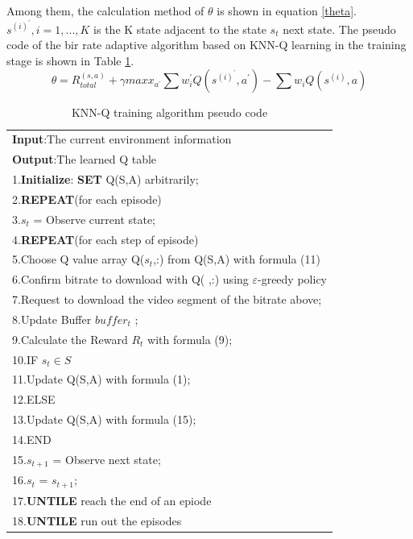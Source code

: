 \documentclass[twocolumn]{article}
\renewcommand\arraystretch{1.2}
\begin{document}
Among them, the calculation method of $\theta$ is shown in equation \ref{theta}. 
$s^{(i)^{\prime}}, i=1, ..., K$ is the K state adjacent to the state $s_{t}$ next state. 
The pseudo code of the bir rate adaptive algorithm based on KNN-Q learning in the training stage is shown in Table \ref{KNN-Q training}.
\begin{equation}
\label{theta}
\theta=R_{total}^{(s,a)}+\gamma max x_{a^\prime}\sum w_{i}^{\prime}Q(s^{(i)^{\prime}},a^{\prime})-\sum w_{i}Q(s^{(i)},a)
\end{equation}
\begin{table}[htbp]
\renewcommand\arraystretch{0.8}
\centering
\caption{KNN-Q training algorithm pseudo code}
\label{KNN-Q training}
\begin{tabular}{l}
\toprule 
\textbf{Input}:The current environment information\\
\textbf{Output}:The learned Q table\\
\midrule 
1.\textbf{Initialize}:  \textbf{SET} Q(S,A) arbitrarily;\\
2.\textbf{REPEAT}(for each episode)\\     
3.\hspace{1cm}$s_{t}$ = Observe current state;\\
4.\hspace{1cm}\textbf{REPEAT}(for each step of episode)\\
5.\hspace{2cm}Choose Q value array Q($s_{t}$,:) from Q(S,A) with formula (11)\\
6.\hspace{2cm}Confirm bitrate to download with Q( ,:) using $\varepsilon$-greedy policy\\
7.\hspace{2cm}Request to download the video segment of the bitrate above;\\
8.\hspace{2cm}Update Buffer $buffer_{t}$ ;\\
9.\hspace{2cm}Calculate the Reward $R_{t}$ with formula (9); \\
10.\hspace{2cm}IF $s_{t}\in S$ \\
11.\hspace{3cm}Update Q(S,A) with formula (1);\\
12.\hspace{2cm}ELSE\\
13.\hspace{3cm}Update Q(S,A) with formula (15);\\
14.\hspace{2cm}END\\
15.\hspace{2cm}$s_{t+1}$ = Observe next state;\\
16.\hspace{2cm}$s_{t}$ = $s_{t+1}$;\\
17.\hspace{1cm}\textbf{UNTILE} reach the end of an epiode\\
18.\textbf{UNTILE} run out the episodes\\
\bottomrule 
\end{tabular}
\end{table}
\end{document}
